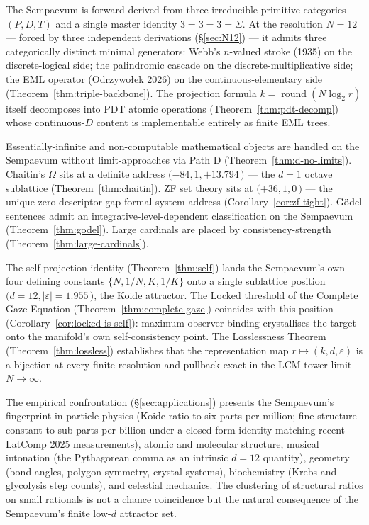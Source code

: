 \documentclass[11pt,a4paper]{article}
\theoremstyle{definition}
\theoremstyle{remark}
\DeclareMathOperator{\round}{round}
\begin{document}
The Sempaevum is forward-derived from three irreducible primitive categories $(P,D,T)$ and a single master identity $3=3=3=\Sigma$. At the resolution $N=12$ --- forced by three independent derivations (\S\ref{sec:N12}) --- it admits three categorically distinct minimal generators: Webb's $n$-valued stroke (1935) on the discrete-logical side; the palindromic cascade on the discrete-multiplicative side; the EML operator (Odrzywo{\l}ek 2026) on the continuous-elementary side (Theorem~\ref{thm:triple-backbone}). The projection formula $k=\round(N\log_{2}r)$ itself decomposes into PDT atomic operations (Theorem~\ref{thm:pdt-decomp}) whose continuous-$D$ content is implementable entirely as finite EML trees.

Essentially-infinite and non-computable mathematical objects are handled on the Sempaevum without limit-approaches via Path D (Theorem~\ref{thm:d-no-limits}). Chaitin's $\Omega$ sits at a definite address $(-84, 1, +13.794$\,\textcent$)$ --- the $d=1$ octave sublattice (Theorem~\ref{thm:chaitin}). ZF set theory sits at $(+36, 1, 0$\,\textcent$)$ --- the unique zero-descriptor-gap formal-system address (Corollary~\ref{cor:zf-tight}). G\"odel sentences admit an integrative-level-dependent classification on the Sempaevum (Theorem~\ref{thm:godel}). Large cardinals are placed by consistency-strength (Theorem~\ref{thm:large-cardinals}).

The self-projection identity (Theorem~\ref{thm:self}) lands the Sempaevum's own four defining constants $\{N, 1/N, K, 1/K\}$ onto a single sublattice position $(d=12, |\varepsilon|=1.955$\,\textcent$)$, the Koide attractor. The Locked threshold of the Complete Gaze Equation (Theorem~\ref{thm:complete-gaze}) coincides with this position (Corollary~\ref{cor:locked-is-self}): maximum observer binding crystallises the target onto the manifold's own self-consistency point. The Losslessness Theorem (Theorem~\ref{thm:lossless}) establishes that the representation map $r\mapsto(k,d,\varepsilon)$ is a bijection at every finite resolution and pullback-exact in the LCM-tower limit $N\to\infty$.

The empirical confrontation (\S\ref{sec:applications}) presents the Sempaevum's fingerprint in particle physics (Koide ratio to six parts per million; fine-structure constant to sub-parts-per-billion under a closed-form identity matching recent LatComp 2025 measurements), atomic and molecular structure, musical intonation (the Pythagorean comma as an intrinsic $d=12$ quantity), geometry (bond angles, polygon symmetry, crystal systems), biochemistry (Krebs and glycolysis step counts), and celestial mechanics. The clustering of structural ratios on small rationals is not a chance coincidence but the natural consequence of the Sempaevum's finite low-$d$ attractor set.
\end{document}
